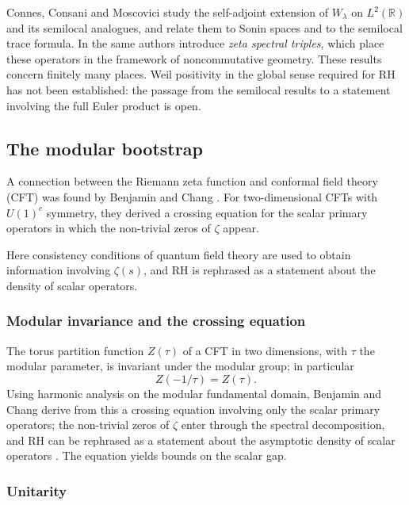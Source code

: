 \documentclass[11pt]{amsart}
\theoremstyle{definition}
\theoremstyle{remark}
\begin{document}
Connes, Consani and Moscovici \cite{connes2024b} study the self-adjoint extension of $W_\lambda$ on $L^2(\mathbb{R})$ and its semilocal analogues, and relate them to Sonin spaces and to the semilocal trace formula. In \cite{connes2025} the same authors introduce \emph{zeta spectral triples}, which place these operators in the framework of noncommutative geometry. These results concern finitely many places. Weil positivity in the global sense required for RH has not been established: the passage from the semilocal results to a statement involving the full Euler product is open.

\subsection{The modular bootstrap}\label{sec:bootstrap}

A connection between the Riemann zeta function and conformal field theory (CFT) was found by Benjamin and Chang \cite{benjamin2022}. For two-dimensional CFTs with $U(1)^c$ symmetry, they derived a crossing equation for the scalar primary operators in which the non-trivial zeros of $\zeta$ appear.

Here consistency conditions of quantum field theory are used to obtain information involving $\zeta(s)$, and RH is rephrased as a statement about the density of scalar operators.

\subsubsection{Modular invariance and the crossing equation}

The torus partition function $Z(\tau)$ of a CFT in two dimensions, with $\tau$ the modular parameter, is invariant under the modular group; in particular
\begin{equation}
Z(-1/\tau) = Z(\tau).
\end{equation}
Using harmonic analysis on the modular fundamental domain, Benjamin and Chang derive from this a crossing equation involving only the scalar primary operators; the non-trivial zeros of $\zeta$ enter through the spectral decomposition, and RH can be rephrased as a statement about the asymptotic density of scalar operators \cite{benjamin2022}. The equation yields bounds on the scalar gap.

\subsubsection{Unitarity}
\end{document}
